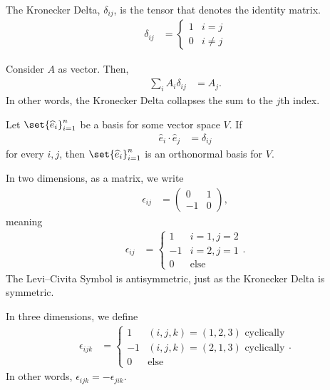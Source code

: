 \documentclass[10pt]{mypackage}
\begin{document}
\begin{definition}
  The Kronecker Delta, $\delta_{ij}$, is the tensor that denotes the identity matrix.
  \begin{align*}
    \delta_{ij} &= \begin{cases}
      1 & i=j\\
      0 & i\neq j
    \end{cases}
  \end{align*}
\end{definition}
\begin{example}
  Consider $A$ as vector. Then,
  \begin{align*}
    \sum_{i}A_i \delta_{ij} &= A_j.
  \end{align*}
  In other words, the Kronecker Delta collapses the sum to the $j$th index.
\end{example}
\begin{example}
  Let $\set{\widehat{e}_i}_{i=1}^{n}$ be a basis for some vector space $V$. If
  \begin{align*}
    \widehat{e}_i\cdot \widehat{e}_j &= \delta_{ij}
  \end{align*}
  for every $i,j$, then $\set{\widehat{e}_i}_{i=1}^{n}$ is an orthonormal basis for $V$.
\end{example}
\begin{definition}
  In two dimensions, as a matrix, we write
  \begin{align*}
    \epsilon_{ij} &= \begin{pmatrix}0 & 1 \\ -1 & 0\end{pmatrix},
  \end{align*}
  meaning
  \begin{align*}
    \epsilon_{ij} &= \begin{cases}
      1 & i=1,j=2\\
      -1 & i=2,j=1\\
      0 & \text{else}
    \end{cases}.
  \end{align*}
  The Levi--Civita Symbol is antisymmetric, just as the Kronecker Delta is symmetric.\newline

  In three dimensions, we define
  \begin{align*}
    \epsilon_{ijk}  &= \begin{cases}
      1 & \text{$\left(i,j,k\right) = \left(1,2,3\right)$ cyclically}\\
      -1 & \text{$\left(i,j,k\right) = \left(2,1,3\right)$ cyclically}\\
      0 & \text{else}
    \end{cases}.
  \end{align*}
  In other words, $\epsilon_{ijk} = -\epsilon_{jik}$.
\end{definition}
\end{document}
